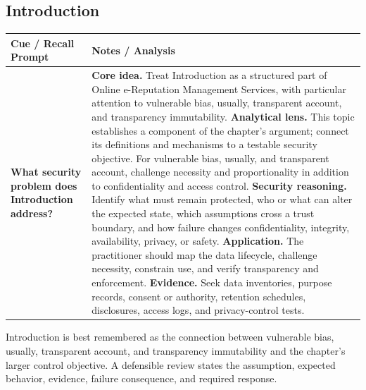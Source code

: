 \documentclass[11pt]{article}
\newcommand{\CornellHeader}{%
\rowcolor{Navy}\color{white}\bfseries Cue / Recall Prompt & \color{white}\bfseries Notes / Analysis\\\hline}
\newcommand{\CornellRow}[2]{%
\cellcolor{CueGray}\RaggedRight\textbf{#1} & \RaggedRight #2\\\hline}
\begin{document}
\subsection*{Introduction}
\begin{longtable}{>{\RaggedRight\arraybackslash}p{}|>{\RaggedRight\arraybackslash}p{}}
\CornellHeader
\CornellRow{What security problem does Introduction address?}{\textbf{Core idea.} Treat Introduction as a structured part of Online e-Reputation Management Services, with particular attention to vulnerable bias, usually, transparent account, and transparency immutability. \textbf{Analytical lens.} This topic establishes a component of the chapter's argument; connect its definitions and mechanisms to a testable security objective. For vulnerable bias, usually, and transparent account, challenge necessity and proportionality in addition to confidentiality and access control. \textbf{Security reasoning.} Identify what must remain protected, who or what can alter the expected state, which assumptions cross a trust boundary, and how failure changes confidentiality, integrity, availability, privacy, or safety. \textbf{Application.} The practitioner should map the data lifecycle, challenge necessity, constrain use, and verify transparency and enforcement. \textbf{Evidence.} Seek data inventories, purpose records, consent or authority, retention schedules, disclosures, access logs, and privacy-control tests.}
\end{longtable}
\begin{topicsummary}
Introduction is best remembered as the connection between vulnerable bias, usually, transparent account, and transparency immutability and the chapter's larger control objective. A defensible review states the assumption, expected behavior, evidence, failure consequence, and required response.
\end{topicsummary}
\end{document}
